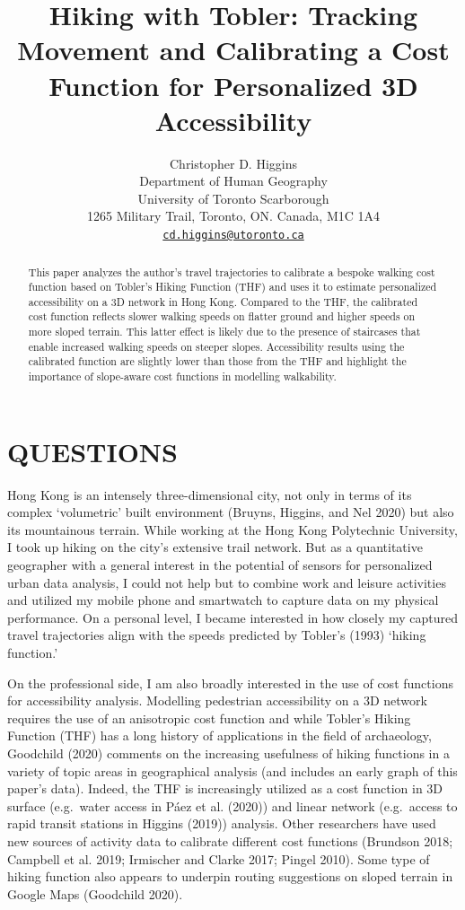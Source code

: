 \documentclass{article}
\title{Hiking with Tobler: Tracking Movement and Calibrating a Cost
Function for Personalized 3D Accessibility}
\author{
    Christopher D. Higgins
   \\
    Department of Human Geography \\
    University of Toronto Scarborough \\
  1265 Military Trail, Toronto, ON. Canada, M1C 1A4 \\
  \texttt{\href{mailto:cd.higgins@utoronto.ca}{\nolinkurl{cd.higgins@utoronto.ca}}} \\
  }
\begin{document}
\maketitle

\def\tightlist{}


\begin{abstract}
This paper analyzes the author's travel trajectories to calibrate a
bespoke walking cost function based on Tobler's Hiking Function (THF)
and uses it to estimate personalized accessibility on a 3D network in
Hong Kong. Compared to the THF, the calibrated cost function reflects
slower walking speeds on flatter ground and higher speeds on more sloped
terrain. This latter effect is likely due to the presence of staircases
that enable increased walking speeds on steeper slopes. Accessibility
results using the calibrated function are slightly lower than those from
the THF and highlight the importance of slope-aware cost functions in
modelling walkability.
\end{abstract}


\hypertarget{questions}{%
\section{QUESTIONS}\label{questions}}

Hong Kong is an intensely three-dimensional city, not only in terms of
its complex `volumetric' built environment (Bruyns, Higgins, and Nel
2020) but also its mountainous terrain. While working at the Hong Kong
Polytechnic University, I took up hiking on the city's extensive trail
network. But as a quantitative geographer with a general interest in the
potential of sensors for personalized urban data analysis, I could not
help but to combine work and leisure activities and utilized my mobile
phone and smartwatch to capture data on my physical performance. On a
personal level, I became interested in how closely my captured travel
trajectories align with the speeds predicted by Tobler's (1993) `hiking
function.'

On the professional side, I am also broadly interested in the use of
cost functions for accessibility analysis. Modelling pedestrian
accessibility on a 3D network requires the use of an anisotropic cost
function and while Tobler's Hiking Function (THF) has a long history of
applications in the field of archaeology, Goodchild (2020) comments on
the increasing usefulness of hiking functions in a variety of topic
areas in geographical analysis (and includes an early graph of this
paper's data). Indeed, the THF is increasingly utilized as a cost
function in 3D surface (e.g.~water access in Páez et al. (2020)) and
linear network (e.g.~access to rapid transit stations in Higgins (2019))
analysis. Other researchers have used new sources of activity data to
calibrate different cost functions (Brundson 2018; Campbell et al. 2019;
Irmischer and Clarke 2017; Pingel 2010). Some type of hiking function
also appears to underpin routing suggestions on sloped terrain in Google
Maps (Goodchild 2020).
\end{document}
